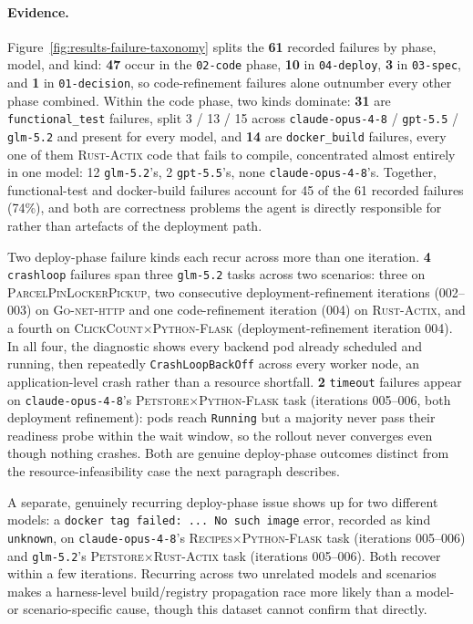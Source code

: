 \paragraph{Evidence.}
Figure~\ref{fig:results-failure-taxonomy} splits the \textbf{61} recorded
failures by phase, model, and kind: \textbf{47} occur in the
\texttt{02-code} phase, \textbf{10} in \texttt{04-deploy}, \textbf{3} in
\texttt{03-spec}, and \textbf{1} in \texttt{01-decision}, so code-refinement
failures alone outnumber every other phase combined. Within the code
phase, two kinds dominate: \textbf{31} are \texttt{functional\_test}
failures, split 3 / 13
/ 15 across \texttt{claude-opus-4-8} / \texttt{gpt-5.5} / \texttt{glm-5.2}
and present for every model, and \textbf{14} are \texttt{docker\_build}
failures, every one of them \textsc{Rust-Actix} code that fails to
compile, concentrated almost entirely in one model: 12
\texttt{glm-5.2}'s, 2 \texttt{gpt-5.5}'s, none
\texttt{claude-opus-4-8}'s. Together, functional-test and docker-build
failures account for 45 of the 61 recorded failures (74\%), and both are
correctness problems the agent is directly responsible for rather than
artefacts of the deployment path.

Two deploy-phase failure kinds each recur across more than one iteration.
\textbf{4} \texttt{crashloop} failures span three \texttt{glm-5.2} tasks
across two scenarios:
three on \textsc{ParcelPinLockerPickup}, two consecutive deployment-refinement
iterations (002--003) on \textsc{Go-net-http} and one code-refinement iteration
(004) on \textsc{Rust-Actix}, and a fourth on
\textsc{ClickCount}$\times$\textsc{Python-Flask} (deployment-refinement iteration
004). In all four, the diagnostic shows every
backend pod already scheduled and running, then repeatedly
\texttt{CrashLoopBackOff} across every worker node, an application-level
crash rather than a resource shortfall. \textbf{2} \texttt{timeout} failures
appear on \texttt{claude-opus-4-8}'s
\textsc{Petstore}$\times$\textsc{Python-Flask} task (iterations 005--006,
both deployment refinement): pods reach \texttt{Running} but a majority never
pass their readiness probe within the wait window, so the rollout never
converges even though nothing crashes. Both are genuine deploy-phase
outcomes distinct from the resource-infeasibility case the next paragraph
describes.

A separate, genuinely recurring deploy-phase issue shows up for two
different models: a \texttt{docker tag failed: ... No such image} error,
recorded as kind \texttt{unknown}, on \texttt{claude-opus-4-8}'s
\textsc{Recipes}$\times$\textsc{Python-Flask} task (iterations 005--006)
and \texttt{glm-5.2}'s \textsc{Petstore}$\times$\textsc{Rust-Actix} task
(iterations 005--006). Both recover within a few iterations. Recurring
across two unrelated models and scenarios makes a harness-level
build/registry propagation race more likely than a model- or
scenario-specific cause, though this dataset cannot confirm that directly.


